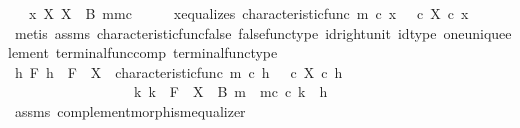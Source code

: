 \begin{isabellebody}
\ \ \ {\isachardoublequoteopen}x\ {\isasymin}\isactrlbsub X\isactrlesub \ {\isacharparenleft}{\kern0pt}X\ {\isasymsetminus}\ {\isacharparenleft}{\kern0pt}B{\isacharcomma}{\kern0pt}\ m{\isacharparenright}{\kern0pt}{\isacharcomma}{\kern0pt}m\isactrlsup c{\isacharparenright}{\kern0pt}{\isachardoublequoteclose}\isanewline
%
\isadelimproof
%
\endisadelimproof
%
\isatagproof
{}\isamarkupfalse%
\ {\isacharminus}{\kern0pt}\isanewline
\ \ \isamarkupfalse%
\ x{\isacharunderscore}{\kern0pt}equalizes{\isacharcolon}{\kern0pt}\ {\isachardoublequoteopen}characteristic{\isacharunderscore}{\kern0pt}func\ m\ {\isasymcirc}\isactrlsub c\ x\ {\isacharequal}{\kern0pt}\ {\isasymf}\ {\isasymcirc}\isactrlsub c\ {\isasymbeta}\isactrlbsub X\isactrlesub \ {\isasymcirc}\isactrlsub c\ x{\isachardoublequoteclose}\isanewline
\ \ \ \ \isamarkupfalse%
\ {\isacharparenleft}{\kern0pt}metis\ assms{\isacharparenleft}{\kern0pt}{}{\isacharparenright}{\kern0pt}\ characteristic{\isacharunderscore}{\kern0pt}func{\isacharunderscore}{\kern0pt}false\ false{\isacharunderscore}{\kern0pt}func{\isacharunderscore}{\kern0pt}type\ id{\isacharunderscore}{\kern0pt}right{\isacharunderscore}{\kern0pt}unit{}\ id{\isacharunderscore}{\kern0pt}type\ one{\isacharunderscore}{\kern0pt}unique{\isacharunderscore}{\kern0pt}element\ terminal{\isacharunderscore}{\kern0pt}func{\isacharunderscore}{\kern0pt}comp\ terminal{\isacharunderscore}{\kern0pt}func{\isacharunderscore}{\kern0pt}type{\isacharparenright}{\kern0pt}\isanewline
\ \ \isamarkupfalse%
\ {\isachardoublequoteopen}{\isasymAnd}h\ F{\isachardot}{\kern0pt}\ h\ {\isacharcolon}{\kern0pt}\ F\ {\isasymrightarrow}\ X\ {\isasymand}\ characteristic{\isacharunderscore}{\kern0pt}func\ m\ {\isasymcirc}\isactrlsub c\ h\ {\isacharequal}{\kern0pt}\ {\isacharparenleft}{\kern0pt}{\isasymf}\ {\isasymcirc}\isactrlsub c\ {\isasymbeta}\isactrlbsub X\isactrlesub {\isacharparenright}{\kern0pt}\ {\isasymcirc}\isactrlsub c\ h\ {\isasymlongrightarrow}\isanewline
\ \ \ \ \ \ \ \ \ \ \ \ \ \ \ \ \ \ {\isacharparenleft}{\kern0pt}{\isasymexists}{\isacharbang}{\kern0pt}k{\isachardot}{\kern0pt}\ k\ {\isacharcolon}{\kern0pt}\ F\ {\isasymrightarrow}\ X\ {\isasymsetminus}\ {\isacharparenleft}{\kern0pt}B{\isacharcomma}{\kern0pt}\ m{\isacharparenright}{\kern0pt}\ {\isasymand}\ m\isactrlsup c\ {\isasymcirc}\isactrlsub c\ k\ {\isacharequal}{\kern0pt}\ h{\isacharparenright}{\kern0pt}{\isachardoublequoteclose}\isanewline
\ \ \ \ \isamarkupfalse%
\ assms\ complement{\isacharunderscore}{\kern0pt}morphism{\isacharunderscore}{\kern0pt}equalizer\ \isamarkupfalse%

\end{isabellebody}
